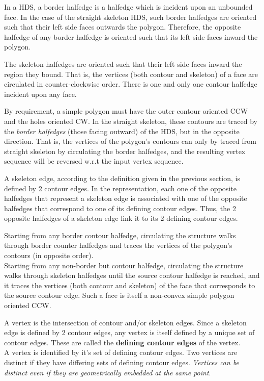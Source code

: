 In a HDS, a border halfedge is a halfedge which is incident upon an unbounded face. In the case of the straight skeleton HDS, such border halfedges are oriented such that their left side faces outwards the polygon. Therefore, the opposite halfedge of any border halfedge is oriented such that its left side faces inward the polygon.

The skeleton halfedges are oriented such that their left side faces inward the region they bound. That is, the vertices (both contour and skeleton) of a face are circulated in counter-clockwise order. There is one and only one contour halfedge incident upon any face. 

By requirement, a simple polygon must have the outer contour oriented CCW and the holes oriented CW. In the straight skeleton, these contours are traced by the \textit{border halfedges} (those facing outward) of the HDS, but in the opposite direction. That is, the vertices of the polygon's contours can only by traced from straight skeleton by circulating the border halfedges, and the resulting vertex sequence will be reversed w.r.t the input vertex sequence.

A skeleton edge, according to the definition given in the previous section, is defined by 2 contour edges. In the representation, each one of the opposite halfedges that represent a skeleton edge is associated with one of the opposite halfedges that correspond to one of its defining contour edges. Thus, the 2 opposite halfedges of a skeleton edge link it to its 2 defining contour edges.

Starting from any border contour halfedge, circulating the structure walks through border counter halfedges and traces the vertices of the polygon's contours (in opposite order).\\
Starting from any non-border but contour halfedge, circulating the structure walks through skeleton halfedges until the source contour halfedge is reached, and it traces the vertices (both contour and skeleton) of the face that corresponds to the source contour edge. Such a face is itself a non-convex simple polygon oriented CCW.

A vertex is the intersection of contour and/or skeleton edges. Since a skeleton edge is defined by 2 contour edges, any vertex is itself defined by a unique set of contour edges. These are called the \textbf{defining contour edges} of the vertex.\\
A vertex is identified by it's set of defining contour edges. Two vertices are distinct if they have differing sets of defining contour edges. \textit{Vertices can be distinct even if they are geometrically embedded at the same point}.
 
